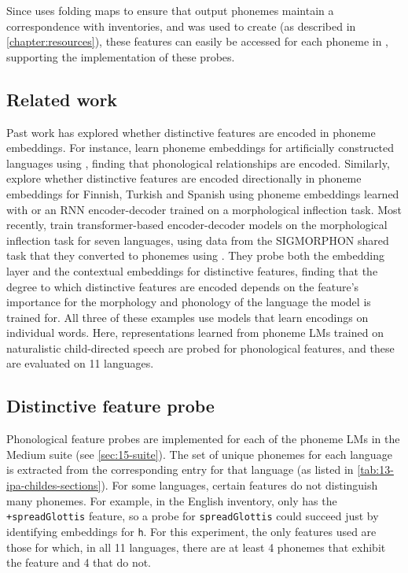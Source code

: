 Since \gpp uses folding maps to ensure that output phonemes maintain a correspondence with \phoible inventories, and \gpp was used to create \ipachildes (as described in \cref{chapter:resources}), these features can easily be accessed for each phoneme in \ipachildes, supporting the implementation of these probes.

\subsection{Related work}

Past work has explored whether distinctive features are encoded in phoneme embeddings. For instance, \citet{kolachina-magyar-2019-phone} learn phoneme embeddings for artificially constructed languages using , finding that phonological relationships are encoded. Similarly, \citet{silfverberg2018sound} explore whether distinctive features are encoded directionally in phoneme embeddings for Finnish, Turkish and Spanish using phoneme embeddings learned with  or an RNN encoder-decoder trained on a morphological inflection task. Most recently, \citet{astrach2025probing} train transformer-based encoder-decoder models on the morphological inflection task for seven languages, using data from the SIGMORPHON shared task \citep{cotterell-etal-2017-conll} that they converted to phonemes using . They probe both the embedding layer and the contextual embeddings for distinctive features, finding that the degree to which distinctive features are encoded depends on the feature's importance for the morphology and phonology of the language the model is trained for. All three of these examples use models that learn encodings on individual words. Here, representations learned from phoneme LMs trained on naturalistic child-directed speech are probed for phonological features, and these are evaluated on 11 languages.

\subsection{Distinctive feature probe}

Phonological feature probes are implemented for each of the  phoneme LMs in the Medium suite (see \cref{sec:15-suite}). The set of unique phonemes for each language is extracted from the corresponding \phoible entry for that language (as listed in \cref{tab:13-ipa-childes-sections}). For some languages, certain features do not distinguish many phonemes. For example, in the English \phoible inventory, only  has the \texttt{+spreadGlottis} feature, so a probe for \texttt{spreadGlottis} could succeed just by identifying embeddings for \texttt{h}. For this experiment, the only features used are those for which, in all 11 languages, there are at least 4 phonemes that exhibit the feature and 4 that do not. 

